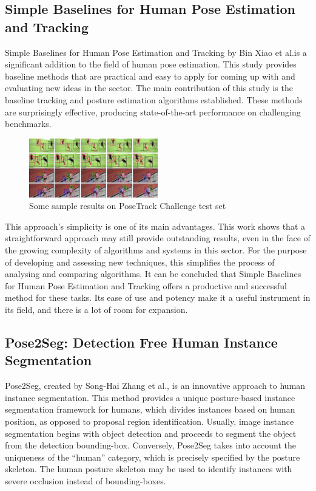 \documentclass[runningheads]{llncs}
\begin{document}
    \subsection{Simple Baselines for Human Pose Estimation and Tracking \parencite{xiao2018simplebaselineshumanpose}}
        Simple Baselines for Human Pose Estimation and Tracking by Bin Xiao et al.\@ is a significant addition to the field of human pose estimation. This study provides baseline methods that are practical and easy to apply for coming up with and evaluating new ideas in the sector.
        The main contribution of this study is the baseline tracking and posture estimation algorithms established. These methods are surprisingly effective, producing state-of-the-art performance on challenging benchmarks.\\

        \begin{figure}[htbp]
            \centering
            \includegraphics[width=0.5\textwidth]{figures/sample.png}
            \caption{Some sample results on PoseTrack Challenge test set}
        \end{figure}

        This approach's simplicity is one of its main advantages. This work shows that a straightforward approach may still provide outstanding results, even in the face of the growing complexity of algorithms and systems in this sector. For the purpose of developing and assessing new techniques, this simplifies the process of analysing and comparing algorithms. It can be concluded that Simple Baselines for Human Pose Estimation and Tracking offers a productive and successful method for these tasks. Its ease of use and potency make it a useful instrument in its field, and there is a lot of room for expansion.

    \subsection{Pose2Seg: Detection Free Human Instance Segmentation \parencite{zhang2019pose2segdetectionfreehuman}}
        Pose2Seg, created by Song-Hai Zhang et al., is an innovative approach to human instance segmentation. This method provides a unique posture-based instance segmentation framework for humans, which divides instances based on human position, as opposed to proposal region identification. Usually, image instance segmentation begins with object detection and proceeds to segment the object from the detection bounding-box. Conversely, Pose2Seg takes into account the uniqueness of the ``human'' category, which is precisely specified by the posture skeleton. The human posture skeleton may be used to identify instances with severe occlusion instead of bounding-boxes.\\
        
\end{document}
